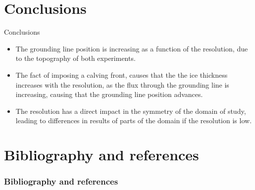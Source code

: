 \documentclass[11pt]{beamer}
\begin{document}
	\section{Conclusions}
		\begin{frame}{Conclusions}
		\begin{itemize}
			\justifying
			\item The grounding line position is increasing as a function of the resolution, due to the topography of both experiments.
			\pause \item The fact of imposing a calving front, causes that the the ice thickness increases with the resolution, as the flux through the grounding line is increasing, causing that the grounding line position advances.
			\pause \item The resolution has a direct impact in the symmetry of the domain of study, leading to differences in results of parts of the domain if the resolution is low.
		\end{itemize}
		\end{frame}
	\section{Bibliography and references}
		\begin{frame}[allowframebreaks]
		\frametitle{Bibliography and references}
			
			
		\end{frame}
\end{document}
